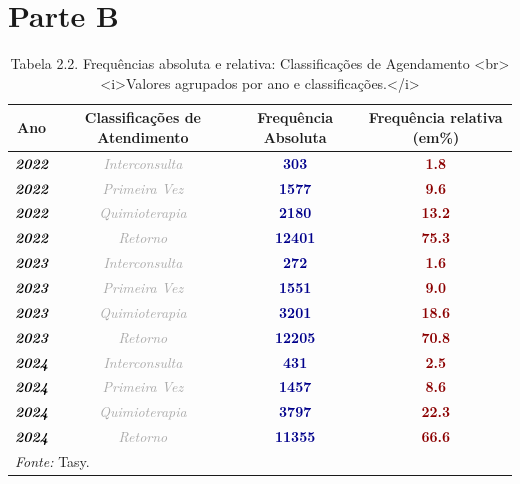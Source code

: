 \documentclass[
  letterpaper,
  DIV=11,
  numbers=noendperiod]{scrreprt}
\begin{document}
\section{Parte B}

\begin{table}
\centering
\caption{Tabela 2.2. Frequências absoluta e relativa: Classificações de Agendamento  <br><i>Valores agrupados por ano e classificações.</i>}
\centering
\begin{tabular}[t]{>{}c|>{}c|>{}c|>{}c}
\hline
Ano & Classificações de Atendimento & Frequência Absoluta & Frequência relativa (em\%)\\
\hline
\textcolor{black}{\em{\textbf{2022}}} & \textcolor{darkgray}{\em{Interconsulta}} & \textcolor{darkblue}{\textbf{303}} & \textcolor{darkred}{\textbf{1.8}}\\
\hline
\textcolor{black}{\em{\textbf{2022}}} & \textcolor{darkgray}{\em{Primeira Vez}} & \textcolor{darkblue}{\textbf{1577}} & \textcolor{darkred}{\textbf{9.6}}\\
\hline
\textcolor{black}{\em{\textbf{2022}}} & \textcolor{darkgray}{\em{Quimioterapia}} & \textcolor{darkblue}{\textbf{2180}} & \textcolor{darkred}{\textbf{13.2}}\\
\hline
\textcolor{black}{\em{\textbf{2022}}} & \textcolor{darkgray}{\em{Retorno}} & \textcolor{darkblue}{\textbf{12401}} & \textcolor{darkred}{\textbf{75.3}}\\
\hline
\textcolor{black}{\em{\textbf{2023}}} & \textcolor{darkgray}{\em{Interconsulta}} & \textcolor{darkblue}{\textbf{272}} & \textcolor{darkred}{\textbf{1.6}}\\
\hline
\textcolor{black}{\em{\textbf{2023}}} & \textcolor{darkgray}{\em{Primeira Vez}} & \textcolor{darkblue}{\textbf{1551}} & \textcolor{darkred}{\textbf{9.0}}\\
\hline
\textcolor{black}{\em{\textbf{2023}}} & \textcolor{darkgray}{\em{Quimioterapia}} & \textcolor{darkblue}{\textbf{3201}} & \textcolor{darkred}{\textbf{18.6}}\\
\hline
\textcolor{black}{\em{\textbf{2023}}} & \textcolor{darkgray}{\em{Retorno}} & \textcolor{darkblue}{\textbf{12205}} & \textcolor{darkred}{\textbf{70.8}}\\
\hline
\textcolor{black}{\em{\textbf{2024}}} & \textcolor{darkgray}{\em{Interconsulta}} & \textcolor{darkblue}{\textbf{431}} & \textcolor{darkred}{\textbf{2.5}}\\
\hline
\textcolor{black}{\em{\textbf{2024}}} & \textcolor{darkgray}{\em{Primeira Vez}} & \textcolor{darkblue}{\textbf{1457}} & \textcolor{darkred}{\textbf{8.6}}\\
\hline
\textcolor{black}{\em{\textbf{2024}}} & \textcolor{darkgray}{\em{Quimioterapia}} & \textcolor{darkblue}{\textbf{3797}} & \textcolor{darkred}{\textbf{22.3}}\\
\hline
\textcolor{black}{\em{\textbf{2024}}} & \textcolor{darkgray}{\em{Retorno}} & \textcolor{darkblue}{\textbf{11355}} & \textcolor{darkred}{\textbf{66.6}}\\
\hline
\multicolumn{4}{l}{\rule{0pt}{1em}\textit{Fonte: } Tasy.}\\
\end{tabular}
\end{table}
\end{document}
